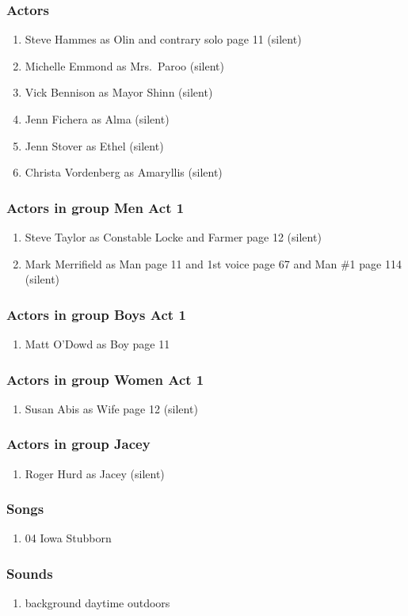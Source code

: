 \subsubsection{Actors}
\begin{enumerate}
\item Steve Hammes as Olin and contrary solo page 11 (silent)
\item Michelle Emmond as Mrs.~Paroo (silent)
\item Vick Bennison as Mayor Shinn (silent)
\item Jenn Fichera as Alma (silent)
\item Jenn Stover as Ethel (silent)
\item Christa Vordenberg as Amaryllis (silent)
\end{enumerate}
\subsubsection{Actors in group Men Act 1}
\begin{enumerate}
\item Steve Taylor as Constable Locke and Farmer page 12 (silent)
\item Mark Merrifield as Man page 11 and 1st voice page 67 and Man \#1 page 114 (silent)
\end{enumerate}
\subsubsection{Actors in group Boys Act 1}
\begin{enumerate}
\item Matt O'Dowd as Boy page 11
\end{enumerate}
\subsubsection{Actors in group Women Act 1}
\begin{enumerate}
\item Susan Abis as Wife page 12 (silent)
\end{enumerate}
\subsubsection{Actors in group Jacey}
\begin{enumerate}
\item Roger Hurd as Jacey (silent)
\end{enumerate}

\subsubsection{Songs}
\begin{enumerate}
\item 04 Iowa Stubborn
\end{enumerate}\subsubsection{Sounds}
\begin{enumerate}
\item background daytime outdoors
\end{enumerate}
